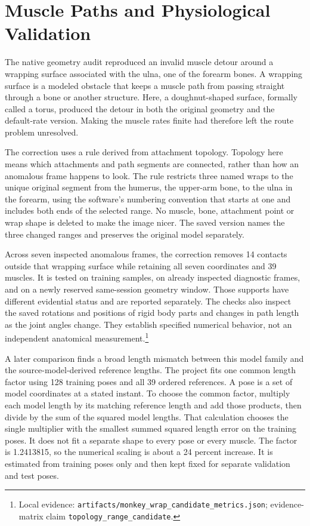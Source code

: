 \section{Muscle Paths and Physiological Validation}

The native geometry audit reproduced an invalid muscle detour around a wrapping surface associated with the ulna, one of the forearm bones. A wrapping surface is a modeled obstacle that keeps a muscle path from passing straight through a bone or another structure. Here, a doughnut-shaped surface, formally called a torus, produced the detour in both the original geometry and the default-rate version. Making the muscle rates finite had therefore left the route problem unresolved.

The correction uses a rule derived from attachment topology. Topology here means which attachments and path segments are connected, rather than how an anomalous frame happens to look. The rule restricts three named wraps to the unique original segment from the humerus, the upper-arm bone, to the ulna in the forearm, using the software's numbering convention that starts at one and includes both ends of the selected range. No muscle, bone, attachment point or wrap shape is deleted to make the image nicer. The saved version names the three changed ranges and preserves the original model separately.\cite{limblabmodel2026,opensim2018}

Across seven inspected anomalous frames, the correction removes 14 contacts outside that wrapping surface while retaining all seven coordinates and 39 muscles. It is tested on training samples, on already inspected diagnostic frames, and on a newly reserved same-session geometry window. Those supports have different evidential status and are reported separately. The checks also inspect the saved rotations and positions of rigid body parts and changes in path length as the joint angles change. They establish specified numerical behavior, not an independent anatomical measurement.\footnote{Local evidence: \texttt{artifacts/monkey\_wrap\_candidate\_metrics.json}; evidence-matrix claim \texttt{\mbox{topology}\_\allowbreak{}\mbox{range}\_\allowbreak{}\mbox{candidate}}.}

A later comparison finds a broad length mismatch between this model family and the source-model-derived reference lengths. The project fits one common length factor using 128 training poses and all 39 ordered references. A pose is a set of model coordinates at a stated instant. To choose the common factor, multiply each model length by its matching reference length and add those products, then divide by the sum of the squared model lengths. That calculation chooses the single multiplier with the smallest summed squared length error on the training poses. It does not fit a separate shape to every pose or every muscle. The factor is 1.2413815, so the numerical scaling is about a 24 percent increase. It is estimated from training poses only and then kept fixed for separate validation and test poses.

